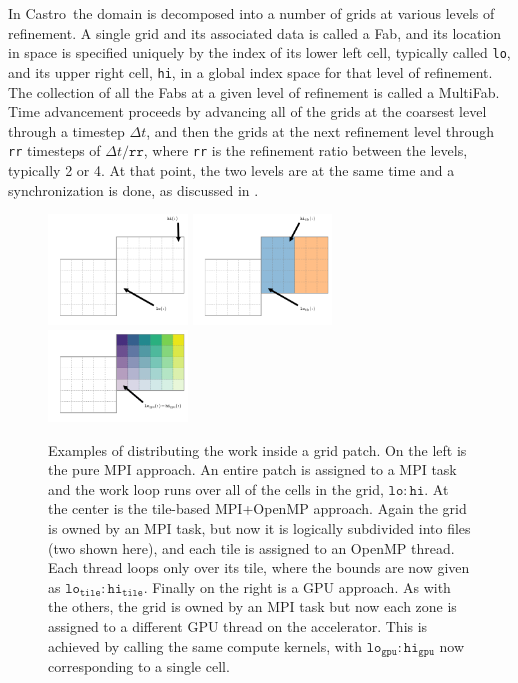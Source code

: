 \documentclass[twocolumn,times]{aastex62}
\newcommand{\castro}{{\sf Castro}}
\newcommand{\fab}{{\sf Fab}}
\newcommand{\multifab}{{\sf MultiFab}}
\begin{document}
In \castro\ the domain is decomposed into a number of grids at various
levels of refinement.  A single grid and its associated data is called
a \fab, and its location in space is specified uniquely by the index
of its lower left cell, typically called {\tt lo}, and its upper right
cell, {\tt hi}, in a global index space for that level of refinement.
The collection of all the \fab s at a given level of refinement is
called a \multifab.  Time advancement proceeds by advancing all of the
grids at the coarsest level through a timestep $\Delta t$, and then
the grids at the next refinement level through {\tt rr} timesteps of
$\Delta t/\mathtt{rr}$, where {\tt rr} is the refinement ratio between
the levels, typically 2 or 4.  At that point, the two levels are at
the same time and a synchronization is done, as discussed in \cite{castro}.

\begin{figure}[t]
\centering
\includegraphics[width=0.33\textwidth]{gpu_1} 
\includegraphics[width=0.33\textwidth]{gpu_2} 
\includegraphics[width=0.33\textwidth]{gpu_3}
\caption{\label{fig:loops} Examples of distributing the work inside a
  grid patch.  On the left is the pure MPI approach.  An entire patch
  is assigned to a MPI task and the work loop runs over all of the
  cells in the grid, $\mathtt{lo:hi}$.  At the center is the
  tile-based MPI+OpenMP approach.  Again the grid is owned by an MPI
  task, but now it is logically subdivided into files (two shown
  here), and each tile is assigned to an OpenMP thread.  Each thread
  loops only over its tile, where the bounds are now given as
  $\mathtt{lo_{tile}:hi_{tile}}$.  Finally on the right is a GPU
  approach.  As with the others, the grid is owned by an MPI task but
  now each zone is assigned to a different GPU thread on the
  accelerator.  This is achieved by calling the same compute kernels,
  with $\mathtt{lo_{gpu}:hi_{gpu}}$ now corresponding to a single cell.}
\end{figure}
\end{document}
